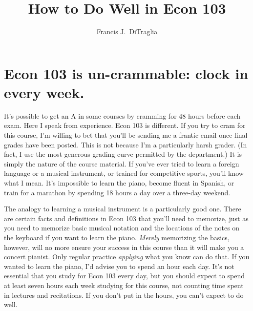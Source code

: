 \documentclass[12pt,letterpaper]{article}
\title{How to Do Well in Econ 103}
\author{Francis J.\ DiTraglia}
\date{}
\begin{document}
\maketitle


\section{Econ 103 is un-crammable: clock in every week.}
It's possible to get an A in some courses by cramming for 48 hours before each exam. Here I speak from experience. Econ 103 is different. If you try to cram for this course, I'm willing to bet that you'll be sending me a frantic email once final grades have been posted. This is not because I'm a particularly harsh grader. (In fact, I use the most generous grading curve permitted by the department.) It is simply the nature of the course material. If you've ever tried to learn a foreign language or a musical instrument, or trained for competitive sports, you'll know what I mean. It's impossible to learn the piano, become fluent in Spanish, or train for a marathon by spending 18 hours a day over a three-day weekend. 

The analogy to learning a musical instrument is a particularly good one. There are certain facts and definitions in Econ 103 that you'll need to memorize, just as you need to memorize basic musical notation and the locations of the notes on the keyboard if you want to learn the piano. \emph{Merely} memorizing the basics, however, will no more ensure your success in this course than it will make you a concert pianist. Only regular practice \emph{applying} what you know can do that. If you wanted to learn the piano, I'd advise you to spend an hour each day. It's not essential that you study for Econ 103 every day, but you should expect to spend at least seven hours each week studying for this course, not counting time spent in lectures and recitations. If you don't put in the hours, you can't expect to do well.
\end{document}
